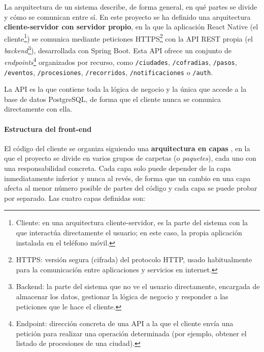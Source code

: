 La arquitectura de un sistema describe, de forma general, en qué partes se divide y cómo se comunican entre sí. En este proyecto se ha definido una arquitectura \textbf{cliente-servidor con servidor propio}, en la que la aplicación React Native (el cliente\footnote{Cliente: en una arquitectura cliente-servidor, es la parte del sistema con la que interactúa directamente el usuario; en este caso, la propia aplicación instalada en el teléfono móvil.}) se comunica mediante peticiones HTTPS\footnote{HTTPS: versión segura (cifrada) del protocolo HTTP, usado habitualmente para la comunicación entre aplicaciones y servicios en internet.} con la API REST propia (el \emph{backend}\footnote{Backend: la parte del sistema que no ve el usuario directamente, encargada de almacenar los datos, gestionar la lógica de negocio y responder a las peticiones que le hace el cliente.}), desarrollada con Spring Boot. Esta API ofrece un conjunto de \emph{endpoints}\footnote{Endpoint: dirección concreta de una API a la que el cliente envía una petición para realizar una operación determinada (por ejemplo, obtener el listado de procesiones de una ciudad).} organizados por recurso, como \texttt{/ciudades}, \texttt{/cofradias}, \texttt{/pasos}, \texttt{/eventos}, \texttt{/procesiones}, \texttt{/recorridos}, \texttt{/notificaciones} o \texttt{/auth}.

La API es la que contiene toda la lógica de negocio y la única que accede a la base de datos PostgreSQL, de forma que el cliente nunca se comunica directamente con ella.

\paragraph{Estructura del front-end}

El código del cliente se organiza siguiendo una \textbf{arquitectura en capas} \cite{sommerville2015}, en la que el proyecto se divide en varios grupos de carpetas (o \emph{paquetes}), cada uno con una responsabilidad concreta. Cada capa solo puede depender de la capa inmediatamente inferior y nunca al revés, de forma que un cambio en una capa afecta al menor número posible de partes del código y cada capa se puede probar por separado. Las cuatro capas definidas son:

